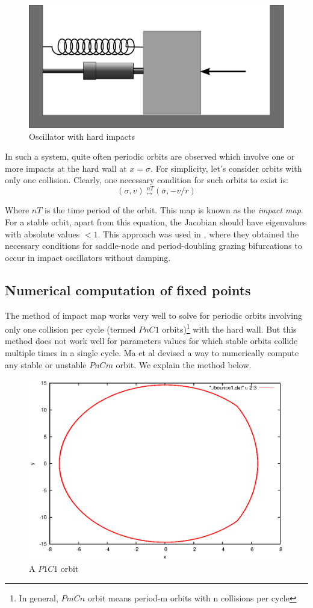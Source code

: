 \documentclass{book}
\renewcommand{\(}{\begin{columns}}
\renewcommand{\)}{\end{columns}}
\newcommand{\<}[1]{\begin{column}{#1}}
\renewcommand{\>}{\end{column}}
\begin{document}
\begin{figure}
\caption{Oscillator with hard impacts}
\begin{center}
\includegraphics[width=0.5\columnwidth]{hardcol}
\end{center}
\end{figure}

In such a system, quite often periodic orbits are observed which involve one 
or more impacts at the hard wall at $x=\sigma$. For simplicity, let's consider 
orbits with only one collision. Clearly, one necessary condition 
for such orbits to exist is:
\[
(\sigma,v)\phantom{.}^{nT}_{\mapsto}(\sigma,-v/r)
\]

Where $nT$ is the time period of the orbit.  This map is known as the 
\emph{impact map}. For a stable orbit, apart from this equation, the Jacobian 
should have eigenvalues with absolute values $<1$. This approach was used
in \cite[Ch.~2;~p.~20]{bernardo-book}, where they obtained the necessary conditions 
for saddle-node and period-doubling grazing bifurcations to occur in impact 
oscillators without damping.  

\subsection{Numerical computation of fixed points}
\label{subsec-num-comp}
The method of impact map works very well to solve for periodic orbits 
involving only one collision per cycle (termed $PnC1$ orbits)\footnote{In 
general, $PmCn$ orbit means period-m orbits with n collisions per cycle} with the hard wall.  But this method does not 
work well for parameters values for which stable orbits collide multiple times 
in a single cycle. Ma et al\cite{ma-nraphson} devised a way to 
numerically compute any stable or unstable $PnCm$ orbit.  We explain the 
method below. 

\begin{figure}
\caption{A $P1C1$ orbit}
\label{fig-p1c1}
\begin{center}
\includegraphics[width=0.5\columnwidth]{p1c1}
\end{center}
\end{figure}
\end{document}
